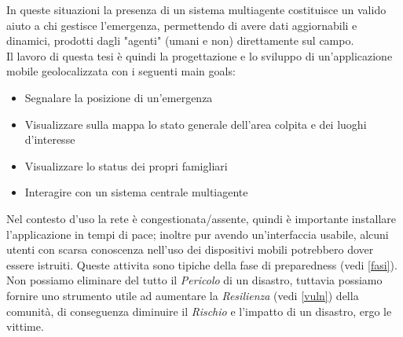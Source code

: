 In queste situazioni la presenza di un sistema multiagente \cite{RESPONSE} costituisce un valido aiuto a chi gestisce l'emergenza, permettendo di avere dati aggiornabili e dinamici, prodotti dagli "agenti" (umani e non) direttamente sul campo. \\
Il lavoro di questa tesi è quindi la progettazione e lo sviluppo di un'applicazione mobile geolocalizzata con i seguenti main goals:
\begin{itemize}
\item Segnalare la posizione di un'emergenza
\item Visualizzare sulla mappa lo stato generale dell'area colpita e dei luoghi d'interesse  
\item Visualizzare lo status dei propri famigliari
\item Interagire con un sistema centrale multiagente
\end{itemize}
Nel contesto d'uso la rete è congestionata/assente, quindi è importante installare l'applicazione in tempi di pace; inoltre pur avendo un'interfaccia usabile, alcuni utenti con scarsa conoscenza nell'uso dei dispositivi mobili potrebbero dover essere istruiti. Queste attivita sono tipiche della fase di preparedness (vedi \ref{fasi}).\\
Non possiamo eliminare del tutto il \textit{Pericolo} di un disastro, tuttavia possiamo fornire uno strumento utile ad aumentare la \textit{Resilienza} (vedi \ref{vuln}) della comunità, di conseguenza diminuire il \textit{Rischio} e l'impatto di un disastro, ergo le vittime.\\
\newpage

